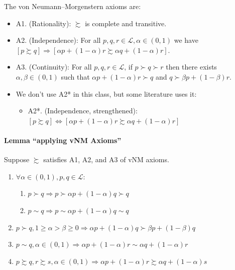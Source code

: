 \documentclass[
]{article}
\providecommand{\tightlist}{%
  \setlength{\itemsep}{0pt}\setlength{\parskip}{0pt}}
\begin{document}
The von Neumann--Morgenstern axioms are:

\begin{itemize}
\tightlist
\item
  A1. (Rationality): \(\succsim\) is complete and transitive.
\item
  A2. (Independence): For all
  \(p,q,r \in \mathcal{L}, \alpha \in (0,1)\) we have
  \([p \succsim q] \Rightarrow [\alpha p + (1-\alpha)r \succsim \alpha q + (1-\alpha)r]\).
\item
  A3. (Continuity): For all \(p, q, r \in \mathcal{L}\), if
  \(p \succ q \succ r\) then there exists \(\alpha, \beta \in (0,1)\)
  such that \(\alpha p + (1- \alpha) r \succ q\) and
  \(q \succ \beta p + (1-\beta) r\).
\item
  We don't use A2* in this class, but some literature uses it:

  \begin{itemize}
  \tightlist
  \item
    A2*. (Independence, strengthened):
    \([p \succsim q] \iff [\alpha p + (1-\alpha) r \succsim \alpha q + (1-\alpha)r]\)
  \end{itemize}
\end{itemize}

\hypertarget{lemma-applying-vnm-axioms}{%
\paragraph{Lemma ``applying vNM
Axioms''}\label{lemma-applying-vnm-axioms}}

Suppose \(\succsim\) satisfies A1, A2, and A3 of vNM axioms.

\begin{enumerate}
\def\labelenumi{(\roman{enumi})}
\tightlist
\item
  \(\forall \alpha \in (0,1), p,q \in \mathcal{L}\):

  \begin{enumerate}
  \def\labelenumii{(\alph{enumii})}
  \tightlist
  \item
    \(p \succ q \Rightarrow p \succ \alpha p + (1 - \alpha) q \succ q\)
  \item
    \(p \sim q \Rightarrow p \sim \alpha p + (1 - \alpha) q \sim q\)
  \end{enumerate}
\item
  \(p \succ q, 1 \geq \alpha > \beta \geq 0 \Rightarrow \alpha p + (1-\alpha)q \succ \beta p + (1-\beta)q\)
\item
  \(p \sim q, \alpha \in (0,1) \Rightarrow \alpha p + (1-\alpha)r \sim \alpha q + (1-\alpha)r\)
\item
  \(p \succsim q, r \succsim s, \alpha \in (0,1) \Rightarrow \alpha p + (1-\alpha)r \succsim \alpha q + (1-\alpha)s\)
\end{enumerate}
\end{document}
